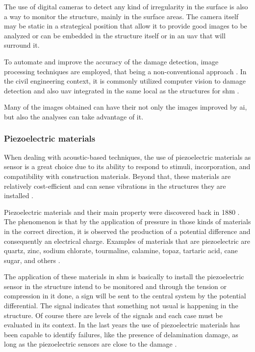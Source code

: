 The use of digital cameras to detect any kind of irregularity in the surface is also a way to monitor the structure, mainly in the surface areas. The camera itself may be static in a strategical position that allow it to provide good images to be analyzed or can be embedded in the structure itself or in an \gls*{uav} that will surround it.

To automate and improve the accuracy of the damage detection, image processing techniques are employed, that being a non-conventional approach \citep{sharma2016}. In the civil engineering context, it is commonly utilized computer vision to damage detection \citep{feng2018} and also \gls*{uav} integrated in the same local as the structures for \gls*{shm} \citep{sankarasrinivasan2015}.

Many of the images obtained can have their not only the images improved by \gls*{ai}, but also the analyses can take advantage of it.

\subsubsection*{Piezoelectric materials}

When dealing with acoustic-based techniques, the use of piezoelectric materials as sensor is a great choice due to its ability to respond to stimuli, incorporation, and compatibility with construction materials. Beyond that, these materials are relatively cost-efficient and can sense vibrations in the structures they are installed \citep{jiao2020}.

Piezoelectric materials and their main property were discovered back in 1880 \citep{curie1880}. 
The phenomenon is that by the application of pressure in those kinds of materials in the correct direction, it is observed the production of a potential difference and consequently an electrical charge. 
Examples of materials that are piezoelectric are quartz, zinc, sodium chlorate, tourmaline, calamine, topaz, tartaric acid, cane sugar, and others \citep{brown1962}.

The application of these materials in \gls*{shm} is basically to install the piezoelectric sensor in the structure intend to be monitored and through the tension or compression in it done, a sign will be sent to the central system by the potential differential. 
The signal indicates that something not usual is happening in the structure. Of course there are levels of the signals and each case must be evaluated in its context. 
In the last years the use of piezoelectric materials has been capable to identify failures, like the presence of delamination damage, as long as the piezoelectric sensors are close to the damage \citep{maio2011}.

